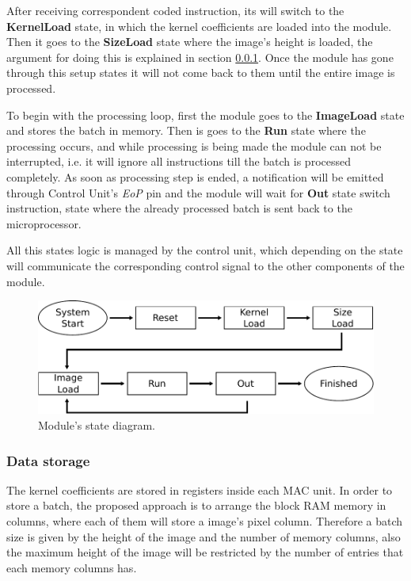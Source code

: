 \documentclass[conference,compsoc]{IEEEtran}
\begin{document}
After receiving correspondent coded instruction, its will switch to the \textbf{KernelLoad} state,
in which the kernel coefficients are loaded into the module. Then it goes to the \textbf{SizeLoad}
state where the image's height is loaded, the argument for doing this is explained in
section \ref{infstorage}. Once the module has gone through this setup states it
will not come back to them until the entire image is processed.

To begin with the processing loop, first the module goes to the \textbf{ImageLoad} state and
stores the batch in memory. Then is goes to the \textbf{Run} state where the
processing occurs, and while processing is being made the module can not be interrupted, i.e.
it will ignore all instructions till the batch is processed completely. As soon as 
processing step is ended, a notification will be emitted through Control Unit's
\textit{EoP} pin and the module will wait for \textbf{Out} state switch instruction, state where the 
already processed batch is sent back to the microprocessor.

All this states logic is managed by the control unit, which depending on the
state will communicate the corresponding control signal to the other components
of the module.

\begin{figure}[!t]
  \centering
  \includegraphics[scale=0.55]{states.pdf}
  \caption{Module's state diagram.}
  \label{state}
\end{figure}

\subsubsection{Data storage}\label{infstorage}
The kernel coefficients are stored in registers inside each MAC unit. In
order to store a batch, the proposed approach is to arrange the block RAM memory
in columns, where each of them will store a image's pixel column. Therefore a
batch size is given by the height of the image and the number of memory columns,
also the maximum height of the image will be restricted by the number of entries
that each memory columns has.
\end{document}
